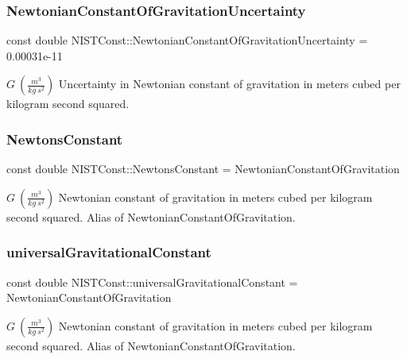 \subsubsection{\texorpdfstring{Newtonian\+Constant\+Of\+Gravitation\+Uncertainty}{NewtonianConstantOfGravitationUncertainty}}
{\footnotesize\ttfamily const double N\+I\+S\+T\+Const\+::\+Newtonian\+Constant\+Of\+Gravitation\+Uncertainty = 0.\+00031e-\/11}

$G \ (\frac{m^3}{kg\ s^2})$ Uncertainty in Newtonian constant of gravitation in meters cubed per kilogram second squared. \mbox{\label{group___gravitational_constant_ga3d83beb8e9a1e0970e5520fe8ca1ace5}} 
\subsubsection{\texorpdfstring{Newtons\+Constant}{NewtonsConstant}}
{\footnotesize\ttfamily const double N\+I\+S\+T\+Const\+::\+Newtons\+Constant = Newtonian\+Constant\+Of\+Gravitation}

$G \ (\frac{m^3}{kg\ s^2})$ Newtonian constant of gravitation in meters cubed per kilogram second squared. Alias of Newtonian\+Constant\+Of\+Gravitation. \mbox{\label{group___gravitational_constant_ga8d7552c043dbeda8e536ba6a01af9829}} 
\subsubsection{\texorpdfstring{universal\+Gravitational\+Constant}{universalGravitationalConstant}}
{\footnotesize\ttfamily const double N\+I\+S\+T\+Const\+::universal\+Gravitational\+Constant = Newtonian\+Constant\+Of\+Gravitation}

$G \ (\frac{m^3}{kg\ s^2})$ Newtonian constant of gravitation in meters cubed per kilogram second squared. Alias of Newtonian\+Constant\+Of\+Gravitation. 